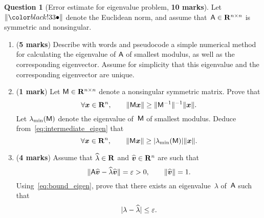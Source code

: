 \documentclass[11pt]{article}
\theoremstyle{definition}
\newtheorem{question}{Question}
\theoremstyle{remark}
\begin{document}
\newpage
\begin{question}
    [Error estimate for eigenvalue problem, \textbf{10 marks}]
    Let $\norm{\placeholder}$ denote the Euclidean norm,
    and assume that~$\mathsf A \in \mathbf R^{n \times n}$ is symmetric and nonsingular.

    \begin{enumerate}
        \item
            (\textbf{5 marks})
            Describe with words and pseudocode a simple numerical method for calculating the eigenvalue of $\mathsf A$ of smallest modulus,
            as well as the corresponding eigenvector.
            Assume for simplicity that this eigenvalue and the corresponding eigenvector are unique.

        \item
            (\textbf{1 mark})
            Let $\mathsf M \in \mathbf R^{n \times n}$ denote a nonsingular symmetric matrix.
            Prove that
            \begin{equation}
                \label{eq:intermediate_eigen}
                \forall \mathbf{\boldsymbol{x}} \in \mathbf R^n, \qquad
                \lVert\mathsf M \mathbf{\boldsymbol{x}}\rVert \geq \lVert\mathsf M^{-1}\rVert^{-1} \lVert\mathbf{\boldsymbol{x}}\rVert.
            \end{equation}
            Let $\lambda_{\min}(\mathsf M)$ denote the eigenvalue of~$\mathsf M$ of smallest modulus.
            Deduce from~\eqref{eq:intermediate_eigen} that
            \begin{equation}
                \label{eq:bound_eigen}
                \forall \mathbf{\boldsymbol{x}} \in \mathbf R^n, \qquad
                \lVert\mathsf M \mathbf{\boldsymbol{x}}\rVert \geq \lvert\lambda_{\min}(\mathsf M)\rvert \lVert\mathbf{\boldsymbol{x}}\rVert.
            \end{equation}

        \item
            (\textbf{4 marks})
            Assume that $\widehat \lambda \in \mathbf R$ and $\widehat{\mathbf{\boldsymbol{v}}} \in \mathbf R^n$ are such that
            \begin{equation}
                \label{eq:bound}
                \lVert\mathsf A \widehat{\mathbf{\boldsymbol{v}}} - \widehat{\lambda} \widehat{\mathbf{\boldsymbol{v}}}\rVert = \varepsilon > 0,
                \qquad \lVert\widehat {\mathbf{\boldsymbol{v}}}\rVert = 1.
            \end{equation}
            Using~\eqref{eq:bound_eigen},
            prove that there exists an eigenvalue~$\lambda$ of~$\mathsf A$ such that
            \[
                \lvert\lambda - \widehat \lambda\rvert \leq \varepsilon.
            \]


\end{enumerate}
\end{question}
\end{document}
